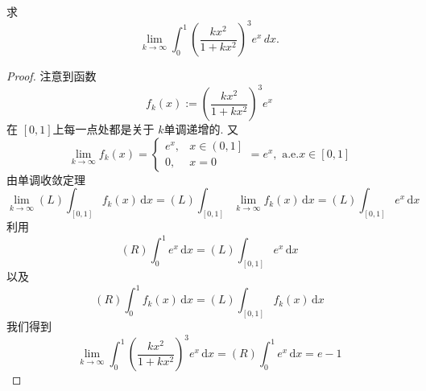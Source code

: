 \documentclass[../main.tex]{subfiles}
\begin{document}
\begin{exercise}{}{}
求
\[
\lim_{k\to\infty}\int_{0}^{1}\left(\frac{kx^{2}}{1+kx^{2}}\right)^{3}e^{x}\,dx.
\]
\end{exercise}

\begin{proof}
    注意到函数 \[
    f_{k}\left( x \right):= \left( \frac{kx^{2} }{1+ kx^{2} }  \right)^{3}e^{x}  
    \]在 \(  \left[ 0,1 \right]   \)上每一点处都是关于 \(  k  \)单调递增的. 又 \[
    \lim_{k\to \infty}f_{k}\left( x \right)= \begin{cases} e^{x},& x\in \left( 0,1 \right]\\ 
     0,& x= 0  \end{cases}  = e^{x}, \text{ a.e.} x\in \left[ 0,1 \right] 
    \]由单调收敛定理 \[
   \lim_{k\to \infty} \left( L \right)\int_{[0,1]}f_{k}\left( x \right)\,\mathrm{d} x  = \left( L \right)\int_{\left[ 0,1 \right] }\lim_{k\to \infty}f_{k}\left( x \right)\,\mathrm{d} x= \left( L \right)\int_{\left[ 0,1 \right] }e^{x}\,\mathrm{d} x   
    \]  利用 \[
 \left( R \right)\int_{0}^{1}e^{x}\,\mathrm{d} x= \left( L \right)\int_{\left[ 0,1 \right] }e^{x}\,\mathrm{d} x  
    \]以及 \[
    \left( R \right)\int_{0}^{1}f_{k}\left( x \right)\,\mathrm{d} x= \left( L \right)\int_{\left[ 0,1 \right] }f_{k}\left( x \right)\,\mathrm{d} x    
    \]我们得到 \[
    \lim_{k\to \infty}\int_{0}^{1}\left( \frac{kx^{2} }{1+ kx^{2} }  \right)^{3}e^{x}\,\mathrm{d} x= \left( R \right)\int_{0}^{1}e^{x}\,\mathrm{d} x= e-1  
    \]
\end{proof}
\end{document}
